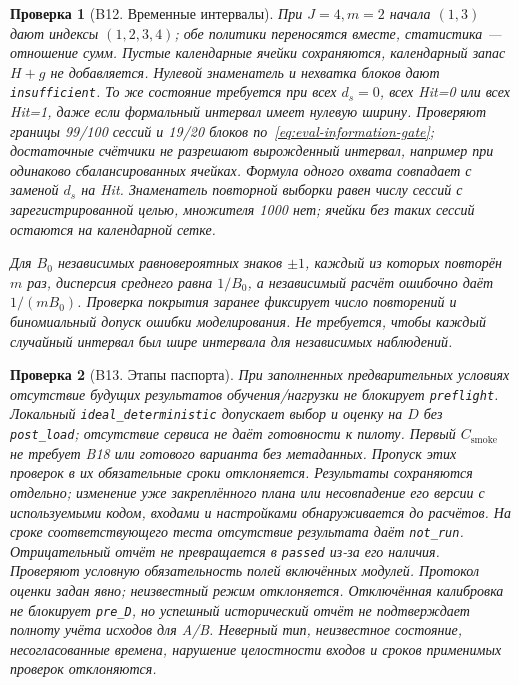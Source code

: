 \documentclass[12pt,a4paper]{article}
\newcommand{\code}[1]{{\ttfamily\small\nolinkurl{#1}}}
\theoremstyle{plainru}
\newtheorem{testcase}{Проверка}[section]
\begin{document}
\begin{testcase}[B12. Временные интервалы]
При $J=4,m=2$ начала $(1,3)$ дают индексы $(1,2,3,4)$;
обе политики переносятся вместе, статистика --- отношение сумм.
Пустые календарные ячейки сохраняются, календарный запас $H+g$ не добавляется.
Нулевой знаменатель и нехватка блоков дают \code{insufficient}.
То же состояние требуется при всех $d_s=0$, всех Hit=0 или всех Hit=1,
даже если формальный интервал имеет нулевую ширину.
Проверяют границы 99/100 сессий и 19/20 блоков
по~\eqref{eq:eval-information-gate}; достаточные счётчики не разрешают
вырожденный интервал, например при одинаково сбалансированных ячейках.
Формула одного охвата совпадает с заменой $d_s$ на Hit.
Знаменатель повторной выборки равен
числу сессий с зарегистрированной целью, множителя 1000 нет;
ячейки без таких сессий остаются на календарной сетке.

Для $B_0$ независимых равновероятных знаков $\pm1$,
каждый из которых повторён $m$ раз,
дисперсия среднего равна $1/B_0$, а независимый расчёт ошибочно даёт
$1/(mB_0)$. Проверка покрытия заранее фиксирует число повторений
и биномиальный допуск ошибки моделирования. Не требуется, чтобы
каждый случайный интервал был шире интервала для независимых наблюдений.
\end{testcase}

\begin{testcase}[B13. Этапы паспорта]
При заполненных предварительных условиях отсутствие будущих
результатов обучения/нагрузки не блокирует \code{preflight}.
Локальный \code{ideal_deterministic} допускает выбор и оценку на $D$
без \code{post_load}; отсутствие сервиса не даёт готовности к пилоту.
Первый $C_{\mathrm{smoke}}$ не требует B18 или готового варианта
без метаданных. Пропуск этих проверок в их
обязательные сроки отклоняется. Результаты сохраняются отдельно;
изменение уже закреплённого плана или несовпадение его версии
с используемыми кодом, входами и настройками обнаруживается до расчётов.
На сроке соответствующего теста отсутствие результата даёт \code{not_run}.
Отрицательный отчёт не превращается в \code{passed} из-за его наличия.
Проверяют условную обязательность полей включённых модулей.
Протокол оценки задан явно; неизвестный режим отклоняется.
Отключённая калибровка не блокирует \code{pre_D}, но успешный
исторический отчёт не подтверждает полноту учёта исходов для A/B.
Неверный тип, неизвестное состояние, несогласованные времена,
нарушение целостности входов и сроков применимых проверок отклоняются.
\end{testcase}
\end{document}
